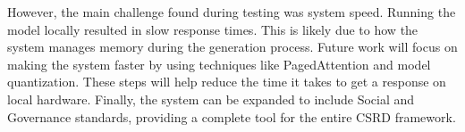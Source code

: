 \documentclass[12pt]{article}
\begin{document}
However, the main challenge found during testing was system speed. Running the model locally resulted in slow response times. This is likely due to how the system manages memory during the generation process. Future work will focus on making the system faster by using techniques like PagedAttention and model quantization. These steps will help reduce the time it takes to get a response on local hardware. Finally, the system can be expanded to include Social and Governance standards, providing a complete tool for the entire CSRD framework.



\end{document}
